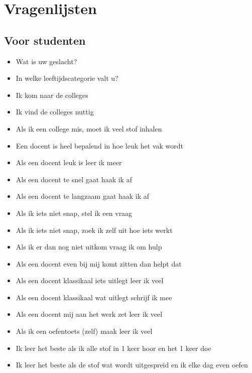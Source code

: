 \section{Vragenlijsten}
\label{sec:vragenlijstRP}
\subsection{Voor studenten}
\begin{itemize}
  \item Wat is uw geslacht?
  \item In welke leeftijdscategorie valt u?
  \item Ik kom naar de colleges
  \item Ik vind de colleges nuttig
  \item Als ik een college mis, moet ik veel stof inhalen
  \item Een docent is heel bepalend in hoe leuk het vak wordt
  \item Als een docent leuk is leer ik meer
  \item Als een docent te snel gaat haak ik af
  \item Als een docent te langzaam gaat haak ik af
  \item Als ik iets niet snap, stel ik een vraag
  \item Als ik iets niet snap, zoek ik zelf uit hoe iets werkt
  \item Als ik er dan nog niet uitkom vraag ik om hulp
  \item Als een docent even bij mij komt zitten dan helpt dat
  \item Als een docent klassikaal iets uitlegt leer ik veel
  \item Als een docent klassikaal wat uitlegt schrijf ik mee
  \item Als een docent mij aan het werk zet leer ik veel
  \item Als ik een oefentoets (zelf) maak leer ik veel
  \item Ik leer het beste als ik alle stof in 1 keer hoor en het 1 keer doe
  \item Ik leer het beste als de stof wat wordt uitgespreid en ik elke dag even oefen
\end{itemize}

